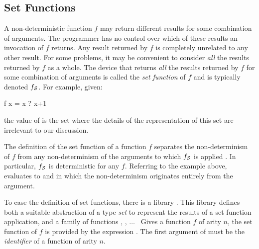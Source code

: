 \newcommand{\funset}[1]{#1\ensuremath{_{\cal S}}}
\subsection{Set Functions}
\label{Set Functions}

A non-deterministic function $f$ may return different results for
some combination of arguments.  The programmer has no control over
which of these results an invocation of $f$ returns.
Any result returned by $f$ is completely unrelated to any other result.
For some problems, it may be convenient to consider \emph{all}
the results returned by $f$ as a whole.
The device that returns \emph{all} the results returned by $f$
for some combination of arguments is called the \emph{set function} of $f$
and is typically denoted $\funset f$.
For example, given:
%
\begin{curry}
f x = x ? x+1
\end{curry}
%
the value of \code{\funset{f} x} is the set 
where the details of the representation of this set are irrelevant to our
discussion.

The definition of the set function of a function $f$
separates the non-determinism of $f$ from any non-determinism
of the arguments to which $\funset{f}$ is applied \cite{AntoyHanus09PPDP}.
In particular, $\funset{f}$ is deterministic for any $f$.
Referring to the example above, \code{\funset{f} (2\,?\,4)} evaluates
to  and  in which the non-determinism
originates entirely from the argument.

To ease the definition of set functions,
there is a library
.
This library defines both a suitable abstraction of a type \emph{set}
to represent the results of a set function application, and
a family of functions , , $\ldots$~
Gives a function $f$ of arity $n$,
the set function of $f$ is provided by the expression .
The first argument of  must be the \emph{identifier}
of a function of arity $n$.

